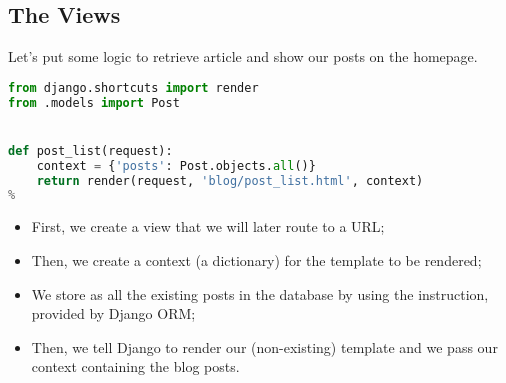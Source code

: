 \subsection{The Views}
    Let's put some logic to retrieve article and show our posts on the homepage.
        
    \begin{lstlisting}[language=python, title=blog/views.py]
from django.shortcuts import render
from .models import Post


def post_list(request):
    context = {'posts': Post.objects.all()}
    return render(request, 'blog/post_list.html', context)
%
    \end{lstlisting}

    \begin{itemize}
        \item First, we create a  view that we will later route to a URL;
        \item Then, we create a context (a dictionary) for the template to be rendered;
        \item We store as  all the existing posts in the database by using the
             instruction, provided by Django ORM;
        \item Then, we tell Django to render our (non-existing) template 
             and we pass our context containing the blog posts.
    \end{itemize}
